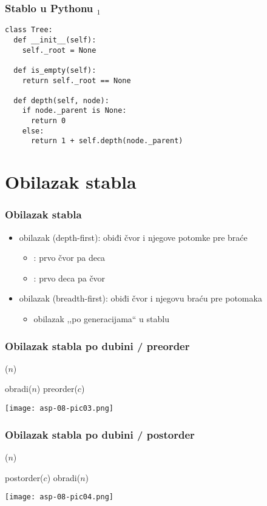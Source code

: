 \documentclass[compress]{beamer}
\begin{document}
\begin{frame}
  \frametitle{Stablo u Pythonu $_1$}
\begin{verbatim}
class Tree:
  def __init__(self):
    self._root = None
  
  def is_empty(self):
    return self._root == None
    
  def depth(self, node):
    if node._parent is None:
      return 0
    else:
      return 1 + self.depth(node._parent)
\end{verbatim}
\end{frame}

\section[Obilazak]{Obilazak stabla}
\begin{frame}[fragile]
  \frametitle{Obilazak stabla}
  \begin{itemize}
    \item obilazak  (depth-first): obiđi čvor i njegove potomke pre braće
    \begin{itemize}
      \item {}: prvo čvor pa deca
      \item {}: prvo deca pa čvor
    \end{itemize}
    \item obilazak  (breadth-first): obiđi čvor i njegovu braću pre potomaka
    \begin{itemize}
      \item obilazak ,,po generacijama`` u stablu
    \end{itemize}
  \end{itemize}
\end{frame}

\begin{frame}[fragile]
  \frametitle{Obilazak stabla po dubini / preorder}
($n$)
\begin{algorithmic}
\STATE obradi($n$)
  \STATE preorder($c$)
\ENDFOR
\end{algorithmic}
\begin{center}
  \texttt{[image: asp-08-pic03.png]}
\end{center}
\end{frame}

\begin{frame}[fragile]
  \frametitle{Obilazak stabla po dubini / postorder}
($n$)
\begin{algorithmic}
  \STATE postorder($c$)
\ENDFOR
\STATE obradi($n$)
\end{algorithmic}
\begin{center}
  \texttt{[image: asp-08-pic04.png]}
\end{center}
\end{frame}
\end{document}
